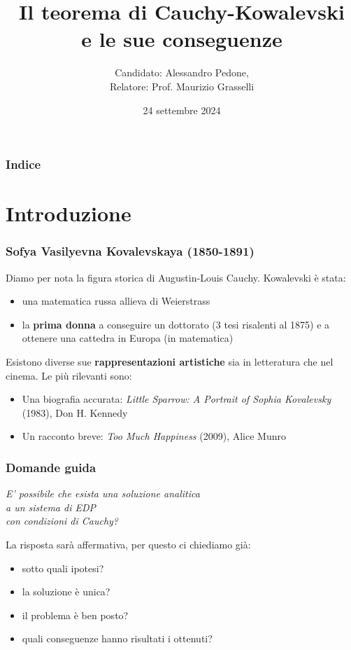 \documentclass[serif,notheorems]{beamer}
\title{Il teorema di Cauchy-Kowalevski\\ e le sue conseguenze }
\author{Candidato: Alessandro Pedone,\\ Relatore: Prof. Maurizio Grasselli }
\institute{Politecnico di Milano}
\date{24 settembre 2024}
\theoremstyle{definition} %
\theoremstyle{remark}
\begin{document}
\frame{\titlepage}
\begin{frame}
    \frametitle{Indice}
    \tableofcontents
\end{frame}


\section{Introduzione}

\begin{frame}
\frametitle{Sofya Vasilyevna Kovalevskaya (1850-1891)}
Diamo per nota la figura storica di Augustin-Louis Cauchy. 
Kowalevski è stata:
\begin{itemize}
\item una matematica russa allieva di Weierstrass
\item la \textbf{prima donna} a conseguire un dottorato (3 tesi risalenti al 1875) e a ottenere una cattedra in Europa (in matematica)
\end{itemize}
\end{frame}

\begin{frame}
Esistono diverse sue \textbf{rappresentazioni artistiche} sia in letteratura che nel cinema. Le più rilevanti sono:
\begin{itemize}
\item Una biografia accurata: \textit{Little Sparrow: A Portrait of Sophia Kovalevsky} (1983), Don H. Kennedy
\item Un racconto breve: \textit{Too Much Happiness} (2009), Alice Munro
\end{itemize}
\end{frame}


\begin{frame}
\frametitle{Domande guida}
\begin{center}
\textit{ E' possibile che esista una soluzione analitica \\ a un sistema di EDP \\ con condizioni di Cauchy?}
\end{center}
\end{frame}

\begin{frame}
La risposta sarà affermativa, per questo ci chiediamo già: 
\begin{itemize}
\item sotto quali ipotesi?
\item la soluzione è unica?
\item il problema è ben posto?
\item quali conseguenze hanno risultati i ottenuti?
\end{itemize}
\end{frame}
\end{document}
